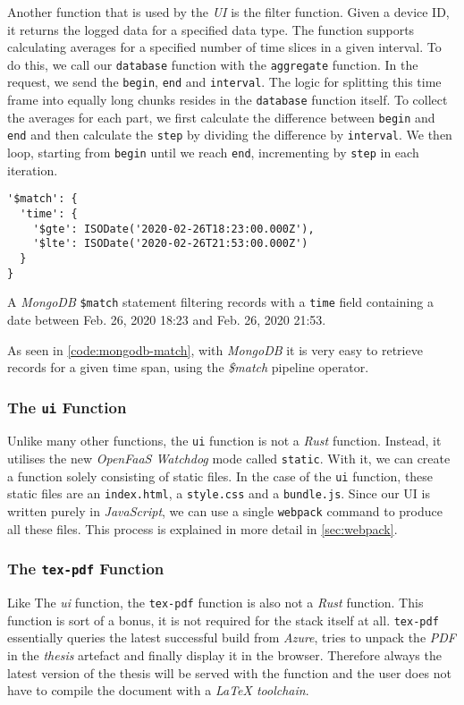 Another function that is used by the \textit{UI} is the filter function. Given a device ID, it
returns the logged data for a specified data type. The function supports calculating averages for a
specified number of time slices in a given interval. To do this, we call our \texttt{database}
function with the \texttt{aggregate} function. In the request, we send the \texttt{begin},
\texttt{end} and \texttt{interval}. The logic for splitting this time frame into equally long chunks
resides in the \texttt{database} function itself. To collect the averages for each part, we first
calculate the difference between \texttt{begin} and \texttt{end} and then calculate the
\texttt{step} by dividing the difference by \texttt{interval}. We then loop, starting from
\texttt{begin} until we reach \texttt{end}, incrementing by \texttt{step} in each iteration.

\begin{code}[H]
  \begin{lstlisting}
'$match': {
  'time': {
    '$gte': ISODate('2020-02-26T18:23:00.000Z'),
    '$lte': ISODate('2020-02-26T21:53:00.000Z')
  }
}
  \end{lstlisting}
  \caption{A \textit{MongoDB} \texttt{\$match} statement filtering records with a \texttt{time}
  field containing a date between Feb. 26, 2020 18:23 and Feb. 26, 2020 21:53.}
  \label{code:mongodb-match}
\end{code}

As seen in \autoref{code:mongodb-match}, with \textit{MongoDB} it is very easy to retrieve records for a
given time span, using the \textit{\$match} pipeline operator.

\subsubsection{The \texttt{ui} Function}

Unlike many other functions, the \texttt{ui} function is not a \textit{Rust} function. Instead, it
utilises the new \textit{OpenFaaS Watchdog} mode called \texttt{static}. With it, we can create a
function solely consisting of static files. In the case of the \texttt{ui} function, these static
files are an \texttt{index.html}, a \texttt{style.css} and a \texttt{bundle.js}. Since our UI is
written purely in \textit{JavaScript}, we can use a single \texttt{webpack} command to produce all
these files. This process is explained in more detail in \autoref{sec:webpack}.

\subsubsection{The \texttt{tex-pdf} Function}

Like The \textit{ui} function, the \texttt{tex-pdf} function is also not a \textit{Rust} function.
This function is sort of a bonus, it is not required for the stack itself at all. \texttt{tex-pdf}
essentially queries the latest successful build from \textit{Azure}, tries to unpack the
\textit{PDF} in the \textit{thesis} artefact and finally display it in the browser. Therefore always
the latest version of the thesis will be served with the function and the user does not have to
compile the document with a \textit{LaTeX toolchain}.
